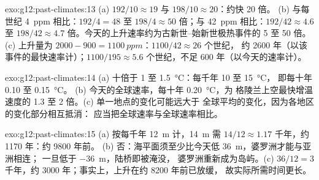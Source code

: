 \begin{solution}{exo:g12:past-climates:13}
(a) $192/10 \approx 19$ 与 $198/10 \approx 20$：约快 20 倍。
(b) 与每世纪 \qty{4}{ppm} 相比：$192/4 = 48$ 至 $198/4 \approx 50$
倍；与 \qty{42}{ppm} 相比：$192/42 \approx 4.6$ 至 $198/42 \approx 4.7$
倍。今天的上升速率约为古新世–始新世极热事件的 5 至 50 倍。
(c) 上升量为 $2000 - 900 = \qty{1100}{ppm}$：$1100/42 \approx 26$ 个世纪，
约 \num{2600} 年（以该事件的最快速率计）；$1100/195 \approx 5.6$
个世纪，不足 600 年（以今天的速率计）。
\end{solution}

\begin{solution}{exo:g12:past-climates:14}
(a) 十倍于 1 至 \qty{1.5}{\degreeCelsius}：每千年 10 至 \qty{15}{\degreeCelsius}，
即每十年 0.10 至 \qty{0.15}{\degreeCelsius}。
(b) 今天的全球速率，每十年 \qty{0.20}{\degreeCelsius}，为
格陵兰上空最快增温速度的 1.3 至 2 倍。(c) 单一地点的变化可能远大于
全球平均的变化，因为各地区的变化部分相互抵消：
应当把全球速率与全球速率相比。
\end{solution}

\begin{solution}{exo:g12:past-climates:15}
(a) 按每千年 \qty{12}{m} 计，\qty{14}{m} 需 $14/12 \approx
1.17$ 千年，约 \num{1170} 年：约 \num{9800} 年前。
(b) 否：海平面须至少比今天低 \qty{36}{m}，婆罗洲才能与亚洲相连；
一旦低于 \qty{-36}{m}，陆桥即被淹没，
婆罗洲重新成为岛屿。(c) $36/12 = 3$ 千年，约
\num{3000} 年；事实上，上升在约 \num{8200} 年前已放缓，
故实际所需时间更长。
\end{solution}

